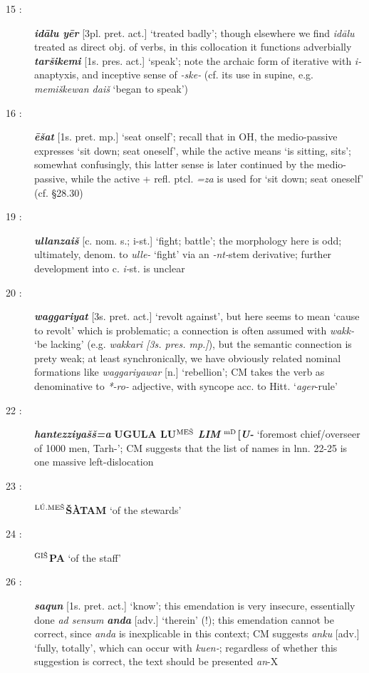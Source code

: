 \documentclass[10pt]{article}
\newcommand{\supersc}[1]{$^{\textrm{\scriptsize{#1}}}$}  	%
\newcommand{\bit}[1]{\textbf{\textit{#1}}}				%
\newcommand{\p}[1]{{\tiny[{#1}]}}					%
\newcommand{\hith}{\textsubwedge{h}}
\newcommand{\men}{\supersc{L\'U.ME\v{S}}}
\newcommand{\mpl}{\supersc{ME\v{S}}}
\newcommand{\wood}{\supersc{GI\v{S}}}
\renewcommand{\.}[1]{\textsubdot{#1}}
\begin{document}
\begin{description}
\item[15 :] \bit{id\=alu y\=er} \p{3pl. pret. act.} `treated badly'; though elsewhere we find \textit{id\=alu} treated as direct obj. of verbs, in this collocation it functions adverbially \bit{tar\v{s}ikemi} \p{1s. pres. act.} `speak'; note the archaic form of iterative with \textit{i-}anaptyxis, and inceptive sense of \textit{-ske-} (cf. its use in supine, e.g. \textit{memi\v{s}kewan dai\v{s}} `began to speak')

\item[16 :] \bit{\=e\v{s}{\hith}at} \p{1s. pret. mp.} `seat onself'; recall that in OH, the medio-passive expresses `sit down; seat oneself', while the active means `is sitting, sits'; somewhat confusingly, this latter sense is later continued by the medio-passive, while the active + refl. ptcl. \textit{=za} is used for `sit down; seat oneself' (cf.  \S28.30)

\item[19 :] \bit{{\hith}ullanzai\v{s}} \p{c. nom. s.; i-st.} `fight; battle'; the morphology here is odd; ultimately, denom. to \textit{{\hith}ulle-} `fight' via an \textit{-nt-}stem derivative; further development into c. \textit{i-}st. is unclear

\item[20 :] \bit{waggariyat} \p{3s. pret. act.} `revolt against', but here seems to mean `cause to revolt' which is problematic; a connection is often assumed with \textit{wakk-} `be lacking'  (e.g. \textit{wakkari \p{3s. pres. mp.}}), but the semantic connection is prety weak; at least synchronically, we have obviously related nominal formations like \textit{waggariyawar} \p{n.} `rebellion'; CM takes the verb as denominative to \textit{*-ro-} adjective, with syncope acc. to Hitt. `\textit{ager}-rule'

\item[22 :] \bit{hantezziya\v{s}\v{s}=a} \textbf{UGULA LU{\mpl}} \bit{LIM} \textbf{\supersc{mD}[}\bit{U-} `foremost chief/overseer of 1000 men, Tarh-'; CM suggests that the list of names in lnn. 22-25 is one massive left-dislocation

\item[23 :] \textbf{{\men}\v{S}\`ATAM} `of the stewards'

\item[24 :] \textbf{{\wood}PA} `of the staff'

\item[26 :] \bit{saq{\hith\hith}un} \p{1s. pret. act.} `know'; this emendation is very insecure, essentially done \textit{ad sensum} \bit{anda} \p{adv.} `therein' (!); this emendation cannot be correct, since \textit{anda} is inexplicable in this context; CM suggests \textit{anku} \p{adv.} `fully, totally', which can occur with \textit{kuen-}; regardless of whether this suggestion is correct, the text should be presented \textit{an}-X


\end{description}
\end{document}
